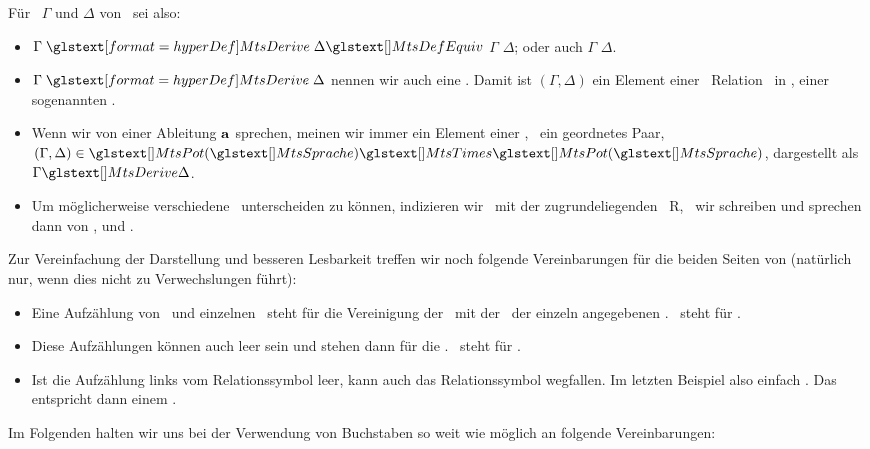 Für \Teilmengen\ $\Gamma$ und $\Delta$ von \MtsSprache\ sei also:
\begin{itemize}
	\item $\Gamma \defSymBin{\MtsDerive} \Delta \MtsDefEquiv$ $\Gamma$  $\Delta$; oder auch $\Gamma$  $\Delta$.
	\item $\Gamma \defSymBin{\MtsDerive} \Delta$ nennen wir auch eine   \MtsSprache.
	Damit ist $(\Gamma,\Delta)$ ein Element einer \binaeren\ Relation \MtsDerive\ in \MtsPotSprache, einer sogenannten .
	\item Wenn wir von einer Ableitung $\mathbf{a}$ sprechen, meinen wir immer ein Element einer \Ableitungsrelation, \textdh\ ein geordnetes Paar, \textzB\ $(\Gamma, \Delta) \in \MtsPotSprache \MtsTimes \MtsPotSprache$, dargestellt als $\Gamma \MtsDerive \Delta$.
	\item Um möglicherweise verschiedene \Ableitungsrelationen\ unterscheiden zu können, indizieren wir  \textggf\ mit der zugrundeliegenden \Relation\ R, \textdh\ wir schreiben  und sprechen dann von ,  und .
\end{itemize}
%
Zur Vereinfachung der Darstellung und besseren Lesbarkeit treffen wir noch folgende Vereinbarungen für die beiden Seiten von \seqqt{$\Gamma \MtsDerive \Delta$} (natürlich nur, wenn dies nicht zu Verwechslungen führt):
\begin{itemize}
	\item Eine Aufzählung von \Formelmengen\ und einzelnen \Formeln\ steht für die Vereinigung der \Formelmengen\ mit der \Menge\ der einzeln angegebenen \Formeln.
	\textZB\ steht \seqqt{$\Gamma, \alpha \MtsDerive \beta$} für \seqqt{$(\Gamma \MtsCup \{\alpha\}) \MtsDerive \{\beta\}$}.
	\item Diese Aufzählungen können auch leer sein und stehen dann für die \leereMenge. \textZB\ steht \seqqt{$\MtsDerive\; \alpha \OjkImp (\beta \OjkImp \alpha)$} für \seqqt{$\MtsEmptyset \MtsDerive \{\alpha \OjkImp (\beta \OjkImp \alpha)\}$}.
	\item Ist die Aufzählung links vom Relationssymbol \chrqt{\MtsDerive} leer, kann auch das Relationssymbol wegfallen.
	Im letzten Beispiel also einfach \seqqt{$\{\alpha \OjkImp (\beta \OjkImp \alpha)\}$}.
	Das entspricht dann einem .
\end{itemize}
%
Im Folgenden halten wir uns bei der Verwendung von Buchstaben so weit wie möglich an folgende Vereinbarungen:%
